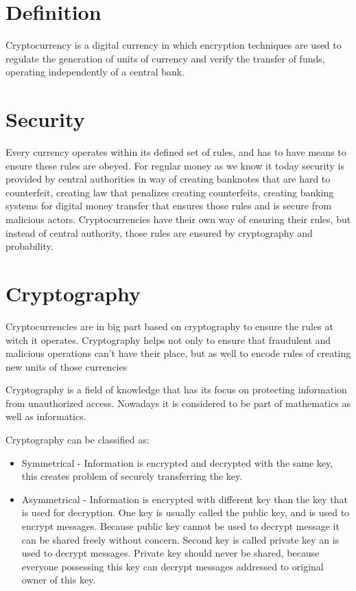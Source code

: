 \documentclass[12pt, en, eng, oneside]{mgr}
\begin{document}
\section{Definition}
Cryptocurrency is a digital currency in which encryption techniques are used to regulate the generation of units of currency and verify the transfer of funds, operating independently of a central bank. \cite{crypto-def}

\section{Security}
Every currency operates within its defined set of rules, and has to have means to ensure these rules are obeyed. For regular money as we know it today security is provided by central authorities in way of creating banknotes that are hard to counterfeit, creating law that penalizes creating counterfeits, creating banking systems for digital money transfer that ensures those rules and is secure from malicious actors. Cryptocurrencies have their own way of ensuring their rules, but instead of central authority, those rules are ensured by cryptography and probability.

\section{Cryptography}
Cryptocurrencies are in big part based on cryptography to ensure the rules at witch it operates. Cryptography helps not only to ensure that fraudulent and malicious operations can't have their place, but as well to encode rules of creating new units of those currencies 

Cryptography is a field of knowledge that has its focus on protecting information from unauthorized access. Nowadays it is considered to be part of mathematics as well as informatics. 

Cryptography can be classified as:

\begin{itemize}
\item
Symmetrical - Information is encrypted and decrypted with the same key, this creates problem of securely transferring the key.
\item
Asymmetrical - Information is encrypted with different key than the key that is used for decryption. One key is usually called the public key, and is used to encrypt messages. Because public key cannot be used to decrypt message it can be shared freely without concern. Second key is called private key an is used to decrypt messages. Private key should never be shared, because everyone possessing this key can decrypt messages addressed to original owner of this key.
\end{itemize} 
\end{document}
